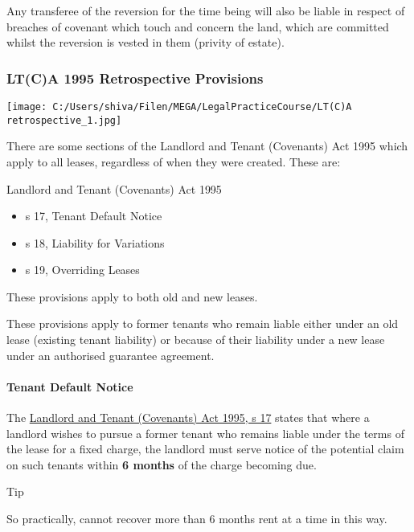 \documentclass[
]{article}
\providecommand{\tightlist}{%
  \setlength{\itemsep}{0pt}\setlength{\parskip}{0pt}}
\newenvironment{env-b23dd66a-8a6c-447d-a163-3614469799d6}
{
    \savenotes\tcolorbox[blanker,breakable,left=5pt,borderline west={2pt}{-4pt}{cyan}]
}
{
    \endtcolorbox\spewnotes
}
\begin{document}
Any transferee of the reversion for the time being will also be liable
in respect of breaches of covenant which touch and concern the land,
which are committed whilst the reversion is vested in them (privity of
estate).

\hypertarget{ltca-1995-retrospective-provisions}{%
\subsubsection{LT(C)A 1995 Retrospective
Provisions}\label{ltca-1995-retrospective-provisions}}

\texttt{[image: C:/Users/shiva/Filen/MEGA/LegalPracticeCourse/LT(C)A retrospective\_1.jpg]}

There are some sections of the Landlord and Tenant (Covenants) Act 1995
which apply to all leases, regardless of when they were created. These
are:

Landlord and Tenant (Covenants) Act 1995

\begin{itemize}
\tightlist
\item
  s 17, Tenant Default Notice
\item
  s 18, Liability for Variations
\item
  s 19, Overriding Leases
\end{itemize}

These provisions apply to both old and new leases.

These provisions apply to former tenants who remain liable either under
an old lease (existing tenant liability) or because of their liability
under a new lease under an authorised guarantee agreement.

\hypertarget{tenant-default-notice}{%
\paragraph{Tenant Default Notice}\label{tenant-default-notice}}

The
\href{https://www.legislation.gov.uk/ukpga/1995/30/section/17}{Landlord
and Tenant (Covenants) Act 1995, s 17} states that where a landlord
wishes to pursue a former tenant who remains liable under the terms of
the lease for a fixed charge, the landlord must serve notice of the
potential claim on such tenants within \textbf{6 months} of the charge
becoming due.

\begin{env-b23dd66a-8a6c-447d-a163-3614469799d6}

Tip

So practically, cannot recover more than 6 months rent at a time in this
way.

\end{env-b23dd66a-8a6c-447d-a163-3614469799d6}
\end{document}
